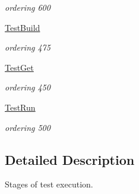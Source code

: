 \begin{DoxyCompactItemize}
\begin{DoxyCompactList}\small\item\em ordering 600 \end{DoxyCompactList}\item 
\hyperlink{group__TestBuild}{Test\-Build}
\begin{DoxyCompactList}\small\item\em ordering 475 \end{DoxyCompactList}\item 
\hyperlink{group__TestGet}{Test\-Get}
\begin{DoxyCompactList}\small\item\em ordering 450 \end{DoxyCompactList}\item 
\hyperlink{group__TestRun}{Test\-Run}
\begin{DoxyCompactList}\small\item\em ordering 500 \end{DoxyCompactList}\end{DoxyCompactItemize}


\subsection{Detailed Description}
Stages of test execution. 